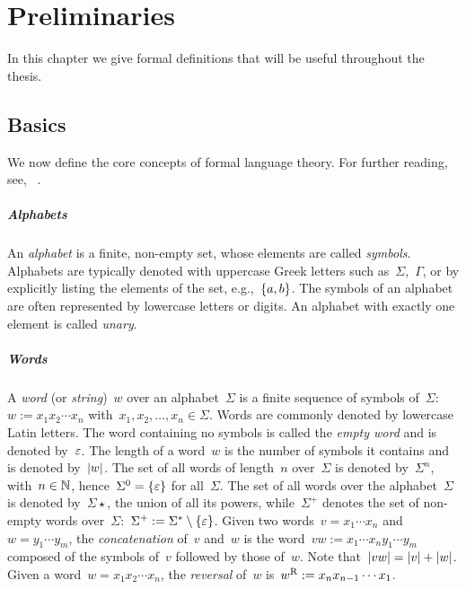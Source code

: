\chapter{Preliminaries}\label{ch:preliminaries}
In this chapter we give formal definitions that will be useful throughout the thesis.



\section{Basics}
We now define the core concepts of formal language theory.
For further reading, see, \eg[,]~\cite{HopUll79,Sha08}.

\paragraph{Alphabets} An \emph{alphabet} is a finite, non-empty set, whose elements are called \emph{symbols}.
Alphabets are typically denoted with uppercase Greek letters such as~$\Sigma$,~$\Gamma$, or by explicitly listing the elements of the set, e.g.,~$\{a,b\}$.
The symbols of an alphabet are often represented by lowercase letters or digits.
An alphabet with exactly one element is called \emph{unary}.

\paragraph{Words} A \emph{word} (or \emph{string})~$w$ over an alphabet~$\Sigma$ is a finite sequence of symbols of~$\Sigma$:~$w:=x_1 x_2 \cdots x_n$ with~$x_1,x_2,\dots,x_n\in\Sigma$.
Words are commonly denoted by lowercase Latin letters.
The word containing no symbols is called the \emph{empty word} and is denoted by~$\varepsilon$.
The length of a word~$w$ is the number of symbols it contains and is denoted by~$\lvert w \rvert$.
The set of all words of length~$n$ over~$\Sigma$ is denoted by~$\Sigma^n$, with~$n\in\mathbb N$, hence~$\Sigma^0=\{\varepsilon\}$ for all~$\Sigma$.
The set of all words over the alphabet~$\Sigma$ is denoted by~$\Sigma\star$, \ie the union of all its powers, while~$\Sigma^+$ denotes the set of non-empty words over~$\Sigma$:~$\Sigma^+ := \Sigma^*\setminus\{\varepsilon\}$.
Given two words~$v=x_1\cdots x_n$ and~$w=y_1\cdots y_m$, the \emph{concatenation} of~$v$ and~$w$ is the word~$vw:=x_1\cdots x_n y_1\cdots y_m$ composed of the symbols of~$v$ followed by those of~$w$.
Note that~$\lvert vw \rvert=\lvert v \rvert+\lvert w \rvert$.
Given a word~$w=x_1 x_2\cdots x_n$, the \emph{reversal} of~$w$ is~$w^{\mathrm R}:=x_n x_{n-1}\cdots x_1$.

